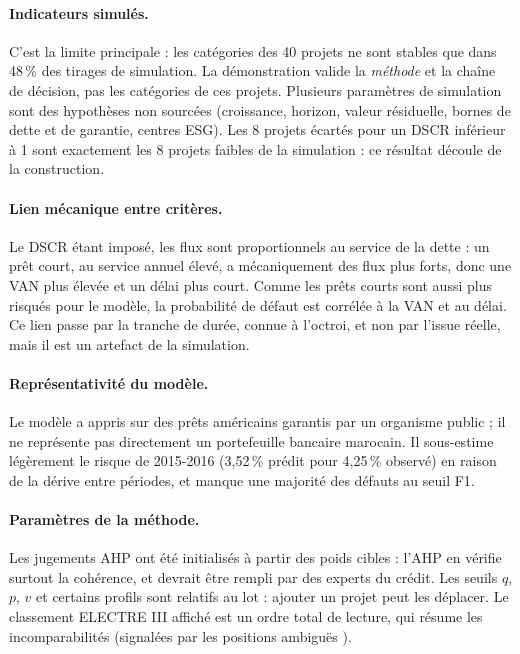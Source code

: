 \paragraph{Indicateurs simulés.} C'est la limite principale : les catégories des 40 projets ne sont stables que dans
48\,\% des tirages de simulation. La démonstration valide la \emph{méthode} et la chaîne de décision, pas les catégories
de ces projets. Plusieurs paramètres de simulation sont des hypothèses non sourcées (croissance, horizon, valeur
résiduelle, bornes de dette et de garantie, centres ESG). Les 8 projets écartés pour un DSCR inférieur à 1 sont
exactement les 8 projets \og faibles \fg{} de la simulation : ce résultat découle de la construction.

\paragraph{Lien mécanique entre critères.} Le DSCR étant imposé, les flux sont proportionnels au service de la dette :
un prêt court, au service annuel élevé, a mécaniquement des flux plus forts, donc une VAN plus élevée et un délai plus
court. Comme les prêts courts sont aussi plus risqués pour le modèle, la probabilité de défaut est corrélée à la VAN et
au délai. Ce lien passe par la tranche de durée, connue à l'octroi, et non par l'issue réelle, mais il est un artefact
de la simulation.

\paragraph{Représentativité du modèle.} Le modèle a appris sur des prêts américains garantis par un organisme public ;
il ne représente pas directement un portefeuille bancaire marocain. Il sous-estime légèrement le risque de 2015-2016
(3,52\,\% prédit pour 4,25\,\% observé) en raison de la dérive entre périodes, et manque une majorité des défauts au
seuil F1.

\paragraph{Paramètres de la méthode.} Les jugements AHP ont été initialisés à partir des poids cibles : l'AHP en
vérifie surtout la cohérence, et devrait être rempli par des experts du crédit. Les seuils $q$, $p$, $v$ et certains
profils sont relatifs au lot : ajouter un projet peut les déplacer. Le classement ELECTRE III affiché est un ordre total
de lecture, qui résume les incomparabilités (signalées par les \og positions ambiguës \fg{}).

